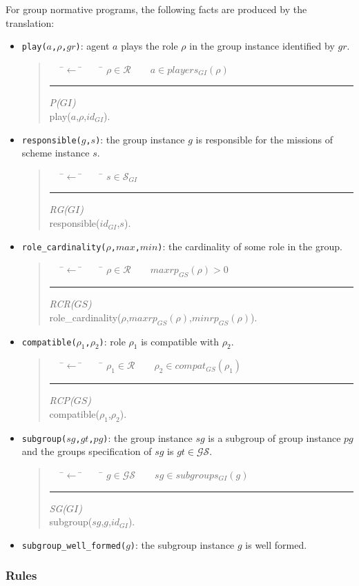 \documentclass{article}
\newcommand{\set}[1]{\mathcal{#1}}
\newcommand{\andalso}{\quad\quad}
\newcommand{\code}[1]{\texttt{#1}}
\newenvironment{rwrule}[2]
{\begin{quote}\ttfamily\begin{tabbing}~~~\=$\leftarrow$ \= ~~~ \= \kill
     \ensuremath{#2}\\
     \rule[2pt]{6.5cm}{.3pt} \hfill \rwlabel{#1}\\}
{\end{tabbing}\end{quote}}
\newcommand{\rwlabel}[1]{{\scshape\itshape\textrm{#1}}}
\theoremstyle{definition} \newtheorem{definition}{Definition}
\begin{document}
For group normative programs, the following facts are
produced by the translation:
\begin{itemize}

\item \code{play($a$,$\rho$,$gr$)}: agent $a$ plays the role $\rho$
  in the group instance identified by $gr$.

  \begin{rwrule}{P($GI$)}
    {\rho \in \set{R} \andalso a \in players_{GI}(\rho)}
    play($a$,$\rho$,$id_{GI}$).
  \end{rwrule}


\item \code{responsible($g$,$s$)}: the group instance $g$ is
  responsible for the missions of scheme instance $s$.

\begin{rwrule}{RG($GI$)}
  {s \in \set{S}_{GI}}
  responsible($id_{GI}$,$s$).
\end{rwrule}

\item \code{role\_cardinality($\rho$,$max$,$min$)}: the cardinality of
  some role in the group.
\begin{rwrule}{RCR($GS$)}
  {\rho \in \set{R} \andalso maxrp_{GS}(\rho) > 0}
  role\_cardinality($\rho$,$maxrp_{GS}(\rho)$,$minrp_{GS}(\rho)$).
\end{rwrule}

\item \code{compatible($\rho_1$,$\rho_2$)}: role $\rho_1$ is compatible with $\rho_2$.
\begin{rwrule}{RCP($GS$)}
  {\rho_1 \in \set{R} \andalso \rho_2 \in compat_{GS}(\rho_1)}
  compatible($\rho_1$,$\rho_2$).
\end{rwrule}

\item \code{subgroup($sg$,$gt$,$pg$)}: the group instance $sg$ is a
  subgroup of group instance $pg$ and the groups specification of $sg$
  is $gt \in \set{GS}$.
  \begin{rwrule}{SG($GI$)}
    {g \in \set{GS} \andalso sg \in subgroups_{GI}(g)}
    subgroup($sg$,$g$,$id_{GI}$).
  \end{rwrule}

\item \code{subgroup\_well\_formed($g$)}: the subgroup instance $g$ is well formed.

\end{itemize}

\subsubsection{Rules}
\end{document}
